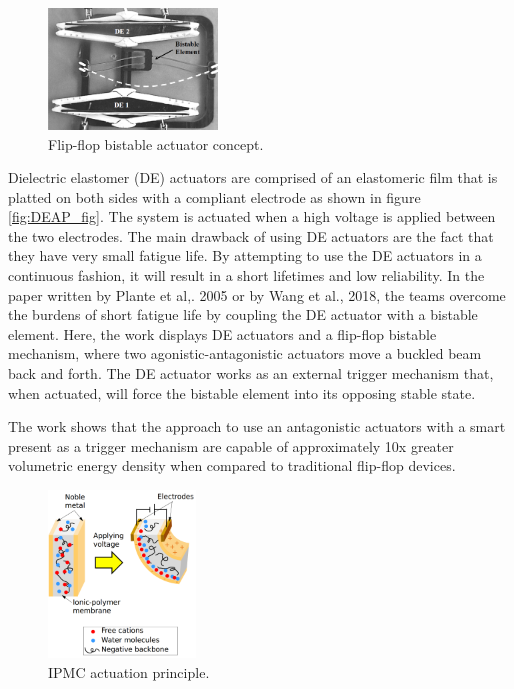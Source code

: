 \begin{figure}
	\centering
	\includegraphics[width=0.4\textwidth]{Figures/DEAP_flipflop.png}
	\caption{Flip-flop bistable actuator concept\cite{plante_compliant_2005}.}
	\label{fig:DEAP_flipflop}
\end{figure}

Dielectric elastomer (DE) actuators are comprised of an elastomeric film that is platted on both sides with a compliant electrode as shown in figure \ref{fig:DEAP_fig}. The system is actuated when a high voltage is applied between the two electrodes. The main drawback of using DE actuators are the fact that they have very small fatigue life. By attempting to use the DE actuators in a continuous fashion, it will result in a short lifetimes and low reliability. In the paper written by Plante et al,. 2005\cite{plante_properties_2007,chouinard_bistable_2012} or by Wang et al., 2018\cite{wang_design_2018}, the teams overcome the burdens of short fatigue life by coupling the DE actuator with a bistable element. Here, the work displays DE actuators and a flip-flop bistable mechanism, where two agonistic-antagonistic actuators move a buckled beam back and forth. The DE actuator works as an external trigger mechanism that, when actuated, will force the bistable element into its opposing stable state.

The work shows that the approach to use an antagonistic actuators with a smart present as a trigger mechanism are capable of approximately 10x greater volumetric energy density when compared to traditional flip-flop devices.\\

\begin{figure}
	\centering
	\vspace{-20pt}
	\includegraphics[width=0.35\textwidth]{Figures/IPMC_fig.png}
	\caption{IPMC actuation principle\cite{poubel_proposal_2011}.}
	\vspace{-15pt}
	\label{fig:IPMC_act}
\end{figure}

